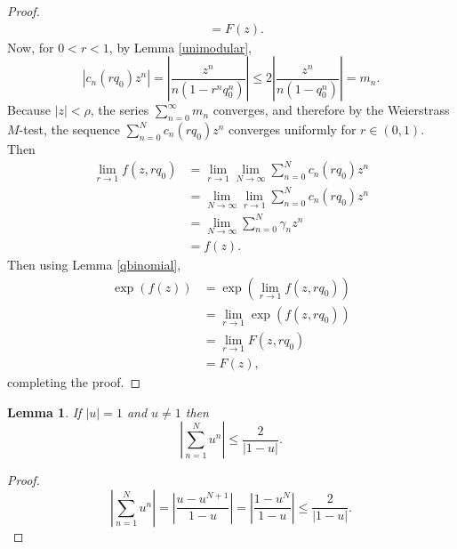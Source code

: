 \documentclass{amsart}
\newtheorem{lemma}[theorem]{Lemma}
\begin{document}
\begin{proof}
\begin{align*}
&=F(z).
\end{align*}
Now, for $0<r<1$, by Lemma \ref{unimodular},
\[
|c_n(rq_0)z^n| = \left| \frac{z^n}{n(1-r^n q_0^n)} \right|
\leq 2 \left| \frac{z^n}{n(1-q_0^n)} \right|
=m_n.
\]
Because $|z|<\rho$, the series $\sum_{n=0}^\infty m_n$ converges, and therefore by the Weierstrass $M$-test, 
the sequence $\sum_{n=0}^N c_n(rq_0) z^n$ converges uniformly for $r \in (0,1)$. Then
\begin{align*}
\lim_{r \to 1} f(z,rq_0)&=\lim_{r \to 1} \lim_{N \to \infty} \sum_{n=0}^N c_n(rq_0)z^n\\
&=\lim_{N \to \infty} \lim_{r \to 1}  \sum_{n=0}^N c_n(rq_0)z^n\\
&=\lim_{N \to \infty} \sum_{n=0}^N \gamma_n z^n\\
&=f(z).
\end{align*}
Then using Lemma \ref{qbinomial},
\begin{align*}
\exp(f(z))&=\exp\left( \lim_{r \to 1} f(z,rq_0) \right)\\
&=\lim_{r \to 1} \exp(f(z,rq_0))\\
&=\lim_{r \to 1} F(z,rq_0)\\
&=F(z),
\end{align*}
completing the proof.
\end{proof}


\begin{lemma}
If $|u|=1$ and $u \neq 1$ then
\[
\left| \sum_{n=1}^N u^n \right|  \leq \frac{2}{|1-u|}.
\]
\label{geometricbound}
\end{lemma}
\begin{proof}
\[
\left| \sum_{n=1}^N u^n \right| = \left| \frac{u-u^{N+1}}{1-u} \right| = \left| \frac{1-u^N}{1-u} \right| \leq \frac{2}{|1-u|}.
\]
\end{proof}
\end{document}
